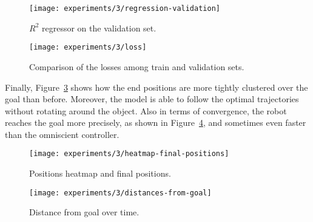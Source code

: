 \begin{figure}[htbp]
	\centerline{\texttt{[image: experiments/3/regression-validation]}}
	\caption{$R^2$ regressor on the validation set.}
	\label{fig:regression-3}
\end{figure}

\begin{figure}[htbp]
	
	\centerline{\texttt{[image: experiments/3/loss]}}
	\caption{Comparison of the losses among train and validation sets.}
	\label{fig:loss-3}
\end{figure}

Finally, Figure~\ref{fig:heatmap-final-positions} shows how the end positions 
are more tightly clustered over the goal than before. Moreover, the model is 
able to follow the optimal trajectories without rotating around the object.
Also in terms of convergence, the robot reaches the goal more precisely, as 
shown in Figure~\ref{fig:distance-from-goal-learned3}, and sometimes even 
faster than the omniscient controller.

\begin{figure}[htbp]
	\centerline{\texttt{[image: experiments/3/heatmap-final-positions]}}
	\caption{Positions heatmap and final positions.}
	\label{fig:heatmap-final-positions}
\end{figure}

\begin{figure}[htbp]
	\centerline{\texttt{[image: experiments/3/distances-from-goal]}}
	\caption{Distance from goal over time.}
	\label{fig:distance-from-goal-learned3}
\end{figure}